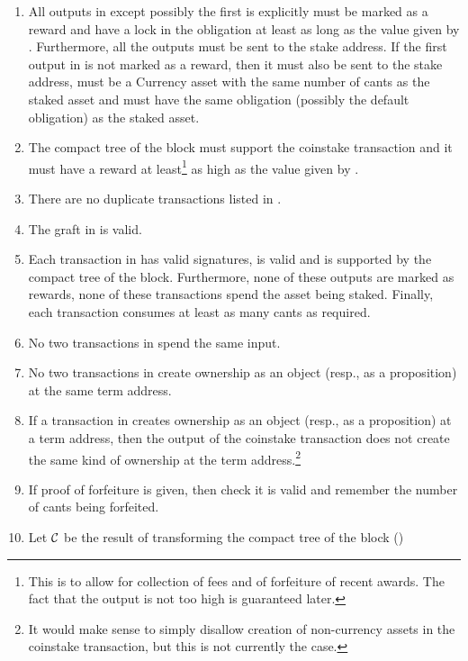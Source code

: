 \begin{itemize}
\begin{enumerate}
is of a preasset with the same amount of cants and the same obligation sent to the stake address.\footnote{This is to support ``loaning'' assets for staking.}
\item All outputs in {} except possibly the first is explicitly must be marked as a reward
and
have a lock in the obligation at least as long as the value given by {}.
Furthermore, all the outputs must be sent to the stake address.
If the first output in {} is not marked as a reward, then it must also
be sent to the stake address, must be a Currency asset with the same number of cants as the staked asset
and must have the same obligation (possibly the default {} obligation) as the staked asset.
\item The compact tree of the block must support the coinstake transaction
and it must have a reward at least\footnote{This is to allow for collection of fees and of forfeiture of recent awards. The fact that the output is not too high is guaranteed later.}
as high as the value given by {}.
\item There are no duplicate transactions listed in {}.
\item The graft in {} is valid.
\item Each transaction in {} has valid signatures, is valid and is supported by the compact tree of the block. Furthermore, none of these outputs are marked as rewards, none of these transactions spend the asset being staked. Finally, each transaction consumes at least as many cants as required.
\item No two transactions in {} spend the same input.
\item No two transactions in {} create ownership as an object (resp., as a proposition) at the same term address.
\item If a transaction in {} creates ownership as an object (resp., as a proposition)
at a term address, then the output of the coinstake transaction does not create the same kind of ownership at the term address.\footnote{It would make sense to simply disallow creation of non-currency assets in the coinstake transaction, but this is not currently the case.}
\item If proof of forfeiture is given, then check it is valid and remember the number of cants being forfeited.
\item Let $\mathcal{C}$ be the result of transforming the compact tree of the block ({})

\end{enumerate}
\end{itemize}
